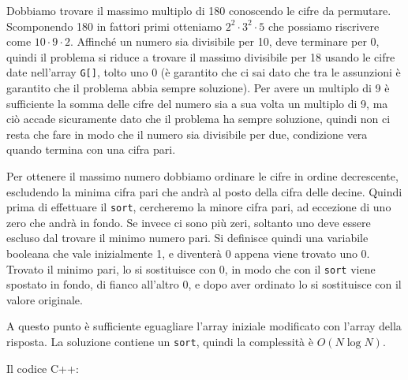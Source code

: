 
Dobbiamo trovare il massimo multiplo di 180 conoscendo le cifre da permutare. Scomponendo 180 in fattori primi otteniamo $2^2\cdot3^2\cdot5$ che possiamo riscrivere come $10\cdot9\cdot2$. Affinché un numero sia divisibile per 10, deve terminare per 0, quindi il problema si riduce a trovare il massimo divisibile per 18 usando le cifre date nell'array \verb|G[]|, tolto uno 0 (è garantito che ci sai dato che tra le assunzioni è garantito che il problema abbia sempre soluzione).
Per avere un multiplo di 9 è sufficiente la somma delle cifre del numero sia a sua volta un multiplo di 9, ma ciò accade sicuramente dato che il problema ha sempre soluzione, quindi non ci resta che fare in modo che il numero sia divisibile per due, condizione vera quando termina con una cifra pari.

Per ottenere il massimo numero dobbiamo ordinare le cifre in ordine decrescente, escludendo la minima cifra pari che andrà al posto della cifra delle decine. Quindi prima di effettuare il \verb|sort|, cercheremo la minore cifra pari, ad eccezione di uno zero che andrà in fondo. Se invece ci sono più zeri, soltanto uno deve essere escluso dal trovare il minimo numero pari. Si definisce quindi una variabile booleana che vale inizialmente 1, e diventerà 0 appena viene trovato uno 0. Trovato il minimo pari, lo si sostituisce con 0, in modo che con il \verb|sort| viene spostato in fondo, di fianco all'altro 0, e dopo aver ordinato lo si sostituisce con il valore originale.

A questo punto è sufficiente eguagliare l'array iniziale modificato con l'array della risposta. La soluzione contiene un \verb|sort|, quindi la complessità è $O\left ( N \log N\right )$.

Il codice C++:
